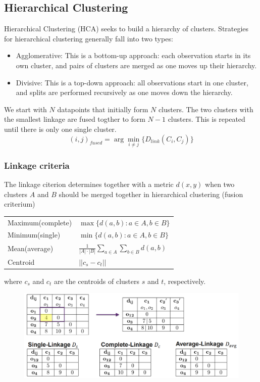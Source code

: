 \subsection{Hierarchical Clustering}
Hierarchical Clustering (HCA) seeks to build a hierarchy of clusters.
Strategies for hierarchical clustering generally fall into two types:
\begin{itemize}
    \item Agglomerative: This is a bottom-up approach: each observation starts in its own cluster, and pairs of clusters are merged as one moves up their hierarchy.
    \item Divisive: This is a top-down approach: all observations start in one cluster, and splits are performed recursively as one moves down the hierarchy.
\end{itemize}
We start with \(N\) datapoints that initially form \(N\) clusters.
The two clusters with the smallest linkage are fused togther to form \(N - 1\) clusters.
This is repeated until there is only one single cluster.
\[
(i,j)_{fused} = \arg\min_{i \neq j}\{D_{link}(C_i,C_j)\}
\]
\subsubsection{Linkage criteria}
The linkage citerion determines together with a metric \(d(x,y)\) when two clusters \(A\) and \(B\) should be merged together in hierarchical clustering (fusion criterium)
\begin{table}[]
    \begin{tabular}{ll}
    Maximum(complete) &  \(\max\{d(a,b): a\in A,b\in B\}\)\\
    Minimum(single) &  \(\min\{d(a,b):a\in A,b\in B\}\)\\
    Mean(average) &  \(\frac{1}{|A|\cdot|B|}\sum_{a\in A}\sum_{b\in B}d(a,b)\)\\
    Centroid & \(||c_s-c_t||\)
    \end{tabular}
\end{table}

where \(c_s\) and \(c_t\) are the centroids of clusters \(s\) and \(t\), respectively.
\begin{figure}[!h]
    \includegraphics[width = \columnwidth]{figures/11/ExampleHCA.png}    
\end{figure}


